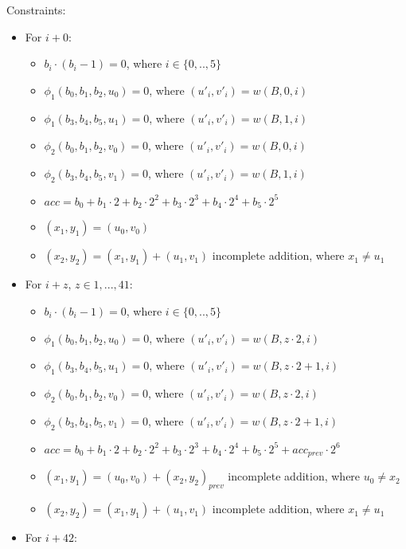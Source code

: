 Constraints:
\begin{itemize}
    \item For $i + 0$:
    \begin{itemize}
        \item $b_i \cdot (b_i - 1) = 0$, where $i \in\{0,.., 5\}$
        \item $\phi_1(b_0, b_1, b_2, u_0) = 0$, where $(u'_{i}, v'_{i}) = w(B, 0, i)$
        \item $\phi_1(b_3, b_4, b_5, u_1) = 0$, where $(u'_{i}, v'_{i}) = w(B, 1, i)$
        \item $\phi_2(b_0, b_1, b_2, v_0) = 0$, where $(u'_{i}, v'_{i}) = w(B, 0, i)$
        \item $\phi_2(b_3, b_4, b_5, v_1) = 0$, where $(u'_{i}, v'_{i}) = w(B, 1, i)$
        \item $acc = b_0 + b_1 \cdot 2 + b_2 \cdot 2^2 + b_3 \cdot 2^3 + b_4 \cdot 2^4 + b_5 \cdot 2^5 $
        \item $(x_1, y_1) = (u_0, v_0)$
        \item $(x_2, y_2) = (x_1, y_1) + (u_1, v_1)$ incomplete addition, where $x_1 \neq u_1$
    \end{itemize}
    \item For $i + z$, $z \in{1, ..., 41}$:
    \begin{itemize}
        \item $b_i \cdot (b_i - 1) = 0$, where $i \in\{0,.., 5\}$
        \item $\phi_1(b_0, b_1, b_2, u_0) = 0$, where $(u'_{i}, v'_{i}) = w(B, z \cdot 2, i)$
        \item $\phi_1(b_3, b_4, b_5, u_1) = 0$, where $(u'_{i}, v'_{i}) = w(B, z \cdot 2 + 1, i)$
        \item $\phi_2(b_0, b_1, b_2, v_0) = 0$, where $(u'_{i}, v'_{i}) = w(B, z \cdot 2, i)$
        \item $\phi_2(b_3, b_4, b_5, v_1) = 0$, where $(u'_{i}, v'_{i}) = w(B, z \cdot 2 + 1, i)$
        \item $acc = b_0 + b_1 \cdot 2 + b_2 \cdot 2^2 + b_3 \cdot 2^3 + b_4 \cdot 2^4 + b_5 \cdot 2^5 + acc_{prev} \cdot 2^6$
        \item $(x_1, y_1) = (u_0, v_0) + (x_2, y_2)_{prev}$  incomplete addition, where $u_0 \neq x_2$
        \item $(x_2, y_2) = (x_1, y_1) + (u_1, v_1)$ incomplete addition, where $x_1 \neq u_1$
    \end{itemize}
    \item For $i + 42$:
    \begin{itemize}

\end{itemize}
\end{itemize}

